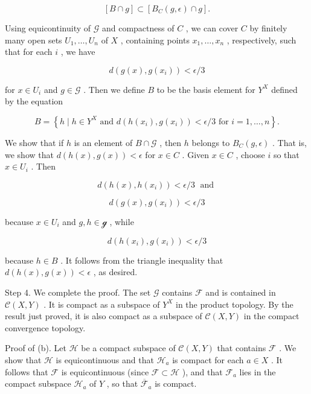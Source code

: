 \documentclass[10pt]{article}
\begin{document}
\[
\left\lbrack  {B \cap  g}\right\rbrack   \subset  \left\lbrack  {{B}_{C}\left( {g,\epsilon }\right)  \cap  g}\right\rbrack  .
\]

Using equicontinuity of \(\mathcal{G}\) and compactness of \(C\) , we can cover \(C\) by finitely many open sets \({U}_{1},\ldots ,{U}_{n}\) of \(X\) , containing points \({x}_{1},\ldots ,{x}_{n}\) , respectively, such that for each \(i\) , we have

\[
d\left( {g\left( x\right) ,g\left( {x}_{i}\right) }\right)  < \epsilon /3
\]

for \(x \in  {U}_{i}\) and \(g \in  \mathcal{G}\) . Then we define \(B\) to be the basis element for \({Y}^{X}\) defined by the equation

\[
B = \left\{  {h \mid  h \in  {Y}^{X}\text{ and }d\left( {h\left( {x}_{i}\right) ,g\left( {x}_{i}\right) }\right)  < \epsilon /3\text{ for }i = 1,\ldots ,n}\right\}  .
\]

We show that if \(h\) is an element of \(B \cap  \mathcal{G}\) , then \(h\) belongs to \({B}_{C}\left( {g,\epsilon }\right)\) . That is, we show that \(d\left( {h\left( x\right) ,g\left( x\right) }\right)  < \epsilon\) for \(x \in  C\) . Given \(x \in  C\) , choose \(i\) so that \(x \in  {U}_{i}\) . Then

\[
d\left( {h\left( x\right) ,h\left( {x}_{i}\right) }\right)  < \epsilon /3\;\text{ and }
\]

\[
d\left( {g\left( x\right) ,g\left( {x}_{i}\right) }\right)  < \epsilon /3
\]

because \(x \in  {U}_{i}\) and \(g,h \in  \mathcal{g}\) , while

\[
d\left( {h\left( {x}_{i}\right) ,g\left( {x}_{i}\right) }\right)  < \epsilon /3
\]

because \(h \in  B\) . It follows from the triangle inequality that \(d\left( {h\left( x\right) ,g\left( x\right) }\right)  < \epsilon\) , as desired.

Step 4. We complete the proof. The set \(\mathcal{G}\) contains \(\mathcal{F}\) and is contained in \(\mathcal{C}\left( {X,Y}\right)\) . It is compact as a subspace of \({Y}^{X}\) in the product topology. By the result just proved, it is also compact as a subspace of \(\mathcal{C}\left( {X,Y}\right)\) in the compact convergence topology.

Proof of (b). Let \(\mathcal{H}\) be a compact subspace of \(\mathcal{C}\left( {X,Y}\right)\) that contains \(\mathcal{F}\) . We show that \(\mathcal{H}\) is equicontinuous and that \({\mathcal{H}}_{a}\) is compact for each \(a \in  X\) . It follows that \(\mathcal{F}\) is equicontinuous (since \(\mathcal{F} \subset  \mathcal{H}\) ), and that \({\mathcal{F}}_{a}\) lies in the compact subspace \({\mathcal{H}}_{a}\) of \(Y\) , so that \({\overline{\mathcal{F}}}_{a}\) is compact.
\end{document}
